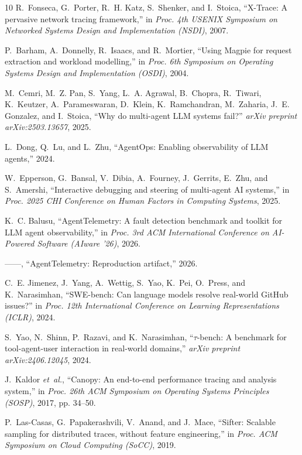 \documentclass[conference]{IEEEtran}
\begin{document}
\begin{thebibliography}{10}
R.~Fonseca, G.~Porter, R.~H. Katz, S.~Shenker, and I.~Stoica, ``{X-Trace}: A
  pervasive network tracing framework,'' in \emph{Proc. 4th USENIX Symposium on
  Networked Systems Design and Implementation (NSDI)}, 2007.

P.~Barham, A.~Donnelly, R.~Isaacs, and R.~Mortier, ``Using {Magpie} for request
  extraction and workload modelling,'' in \emph{Proc. 6th Symposium on Operating
  Systems Design and Implementation (OSDI)}, 2004.

M.~Cemri, M.~Z. Pan, S.~Yang, L.~A. Agrawal, B.~Chopra, R.~Tiwari, K.~Keutzer,
  A.~Parameswaran, D.~Klein, K.~Ramchandran, M.~Zaharia, J.~E. Gonzalez, and
  I.~Stoica, ``Why do multi-agent {LLM} systems fail?'' \emph{arXiv preprint
  arXiv:2503.13657}, 2025.

L.~Dong, Q.~Lu, and L.~Zhu, ``{AgentOps}: Enabling observability of {LLM}
  agents,'' 2024.

W.~Epperson, G.~Bansal, V.~Dibia, A.~Fourney, J.~Gerrits, E.~Zhu, and
  S.~Amershi, ``Interactive debugging and steering of multi-agent {AI}
  systems,'' in \emph{Proc. 2025 CHI Conference on Human Factors in Computing
  Systems}, 2025.

K.~C. Balusu, ``{AgentTelemetry}: A fault detection benchmark and toolkit for
  {LLM} agent observability,'' in \emph{Proc. 3rd ACM International Conference
  on AI-Powered Software (AIware '26)}, 2026.

------, ``{AgentTelemetry}: Reproduction artifact,'' 2026.

C.~E. Jimenez, J.~Yang, A.~Wettig, S.~Yao, K.~Pei, O.~Press, and K.~Narasimhan,
  ``{SWE-bench}: Can language models resolve real-world {GitHub} issues?'' in
  \emph{Proc. 12th International Conference on Learning Representations
  (ICLR)}, 2024.

S.~Yao, N.~Shinn, P.~Razavi, and K.~Narasimhan, ``$\tau$-bench: A benchmark for
  tool-agent-user interaction in real-world domains,'' \emph{arXiv preprint
  arXiv:2406.12045}, 2024.

J.~Kaldor \emph{et~al.}, ``Canopy: An end-to-end performance tracing and
  analysis system,'' in \emph{Proc. 26th ACM Symposium on Operating Systems
  Principles (SOSP)}, 2017, pp. 34--50.

P.~Las-Casas, G.~Papakerashvili, V.~Anand, and J.~Mace, ``Sifter: Scalable
  sampling for distributed traces, without feature engineering,'' in
  \emph{Proc. ACM Symposium on Cloud Computing (SoCC)}, 2019.


\end{thebibliography}
\end{document}
